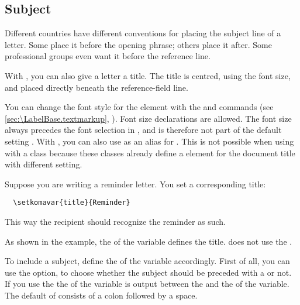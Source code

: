\subsection{Subject}
%
\BeginIndexGroup
{}

Different countries have different conventions for placing the subject line of
a letter. Some place it before the opening phrase; others place it after. Some
professional groups even want it before the reference line.


\begin{Declaration}
\end{Declaration}
With \KOMAScript{}, you can also give a letter a title. The title
is centred, using the  font size, and placed directly beneath the
reference-field line.

%
%
You can change the font style for the
 element with
the  and
 commands (see
\autoref{sec:\LabelBase.textmarkup},
). Font size declarations are
allowed. The  font size always precedes the font selection in
\KOMAScript{}, and is therefore not part of the default setting
. With ,
you can also use  as an
alias for . This is not possible when using
 with a \KOMAScript{} class because these classes already
define a  element for the document title with different
setting.%
%
%
\begin{Example}
  Suppose you are writing a reminder letter. You set a corresponding title:
\begin{lstlisting}
  \setkomavar{title}{Reminder}
\end{lstlisting}
  This way the recipient should recognize the reminder as such.
\end{Example}
As shown in the example, the  of the variable defines the
title. \KOMAScript{} does not use the .%
%
\EndIndexGroup


\begin{Declaration}
\end{Declaration}
%
To include a subject, define the  of the 
variable accordingly. First of all, you can use the
 option,
to choose whether the subject should be preceded with a  or
not. If you use the  the  of the
 variable is output between the
 and the  of the 
variable. The default  of  consists of
a colon followed by a space.

